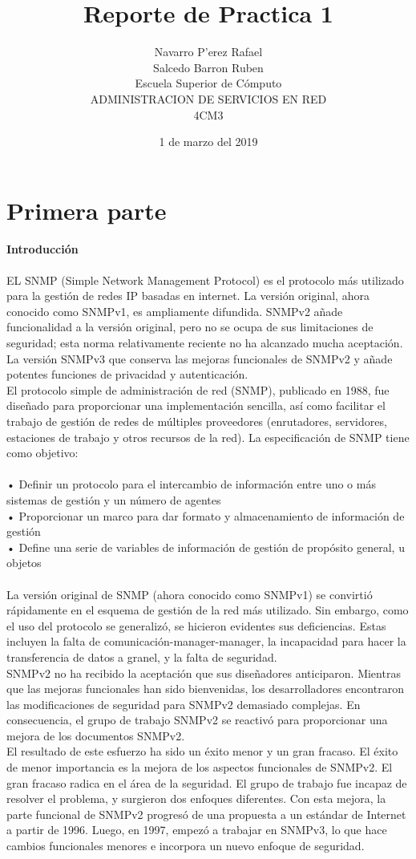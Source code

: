 \documentclass[12pt]{article}
\title{Reporte de  Practica 1}
\author{Navarro P'erez Rafael \\Salcedo Barron Ruben\\
		Escuela Superior de C\'omputo\\
		ADMINISTRACION DE SERVICIOS EN RED\\ 
		4CM3
		}
\date{1 de marzo del 2019}
\begin{document}
\maketitle
\newpage 
\tableofcontents
\newpage 
\section{Primera parte}
\paragraph*{Introducción}
EL SNMP (Simple Network Management Protocol) es el protocolo más utilizado para la gestión de
redes IP basadas en internet. La versión original, ahora conocido como SNMPv1, es ampliamente
difundida. SNMPv2 añade funcionalidad a la versión original, pero no se ocupa de sus limitaciones
de seguridad; esta norma relativamente reciente no ha alcanzado mucha aceptación. La versión
SNMPv3 que conserva las mejoras funcionales de SNMPv2 y añade potentes funciones de
privacidad y autenticación.\\
El protocolo simple de administración de red (SNMP), publicado en 1988, fue diseñado para
proporcionar una implementación sencilla, así como facilitar el trabajo de gestión de redes de
múltiples proveedores (enrutadores, servidores, estaciones de trabajo y otros recursos de la red).
La especificación de SNMP tiene como objetivo:\\\\
• Definir un protocolo para el intercambio de información entre uno o más sistemas de
gestión y un número de agentes\\
• Proporcionar un marco para dar formato y almacenamiento de información de gestión\\
• Define una serie de variables de información de gestión de propósito general, u objetos\\
\\La versión original de SNMP (ahora conocido como SNMPv1) se convirtió rápidamente en el
esquema de gestión de la red más utilizado. Sin embargo, como el uso del protocolo se generalizó,
se hicieron evidentes sus deficiencias. Estas incluyen la falta de comunicación-manager-manager, la
incapacidad para hacer la transferencia de datos a granel, y la falta de seguridad. \\
SNMPv2 no ha recibido la aceptación que sus diseñadores anticiparon. Mientras que las mejoras
funcionales han sido bienvenidas, los desarrolladores encontraron las modificaciones de seguridad
para SNMPv2 demasiado complejas. En consecuencia, el grupo de trabajo SNMPv2 se reactivó para
proporcionar una mejora de los documentos SNMPv2.\\
El resultado de este esfuerzo ha sido un éxito menor y un gran fracaso. El éxito de menor
importancia es la mejora de los aspectos funcionales de SNMPv2. El gran fracaso radica en el área
de la seguridad. El grupo de trabajo fue incapaz de resolver el problema, y surgieron dos enfoques
diferentes. Con esta mejora, la parte funcional de SNMPv2 progresó de una propuesta a un estándar
de Internet a partir de 1996. Luego, en 1997, empezó a trabajar en SNMPv3, lo que hace cambios
funcionales menores e incorpora un nuevo enfoque de seguridad.
\end{document}
